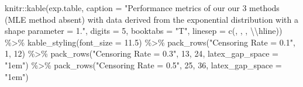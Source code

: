 \documentclass[12pt, twoside]{amherstthesis}
\newenvironment{Shaded}{\begin{snugshade}}{\end{snugshade}}
\newcommand{\AttributeTok}[1]{\textcolor[rgb]{0.77,0.63,0.00}{#1}}
\newcommand{\DecValTok}[1]{\textcolor[rgb]{0.00,0.00,0.81}{#1}}
\newcommand{\FloatTok}[1]{\textcolor[rgb]{0.00,0.00,0.81}{#1}}
\newcommand{\FunctionTok}[1]{\textcolor[rgb]{0.00,0.00,0.00}{#1}}
\newcommand{\NormalTok}[1]{#1}
\newcommand{\SpecialCharTok}[1]{\textcolor[rgb]{0.00,0.00,0.00}{#1}}
\newcommand{\StringTok}[1]{\textcolor[rgb]{0.31,0.60,0.02}{#1}}
\begin{document}
\begin{Shaded}
\begin{Highlighting}[]
\NormalTok{knitr}\SpecialCharTok{::}\FunctionTok{kable}\NormalTok{(exp.table, }\AttributeTok{caption =} \StringTok{"Performance metrics of our our 3 }
\StringTok{             methods (MLE method absent) with data derived from the }
\StringTok{             exponential distribution with a shape parameter = 1."}\NormalTok{, }
             \AttributeTok{digits =} \DecValTok{5}\NormalTok{, }\AttributeTok{booktabs =} \StringTok{"T"}\NormalTok{, }\AttributeTok{linesep =} \FunctionTok{c}\NormalTok{(}\StringTok{\textquotesingle{}\textquotesingle{}}\NormalTok{, }\StringTok{\textquotesingle{}\textquotesingle{}}\NormalTok{, }\StringTok{\textquotesingle{}\textquotesingle{}}\NormalTok{, }\StringTok{\textquotesingle{}}\SpecialCharTok{\textbackslash{}\textbackslash{}}\StringTok{hline\textquotesingle{}}\NormalTok{)) }\SpecialCharTok{\%\textgreater{}\%}
  \FunctionTok{kable\_styling}\NormalTok{(}\AttributeTok{font\_size =} \FloatTok{11.5}\NormalTok{) }\SpecialCharTok{\%\textgreater{}\%}
  \FunctionTok{pack\_rows}\NormalTok{(}\StringTok{"Censoring Rate = 0.1"}\NormalTok{, }\DecValTok{1}\NormalTok{, }\DecValTok{12}\NormalTok{) }\SpecialCharTok{\%\textgreater{}\%}
  \FunctionTok{pack\_rows}\NormalTok{(}\StringTok{"Censoring Rate = 0.3"}\NormalTok{, }\DecValTok{13}\NormalTok{, }\DecValTok{24}\NormalTok{, }\AttributeTok{latex\_gap\_space =} \StringTok{"1em"}\NormalTok{) }\SpecialCharTok{\%\textgreater{}\%}
  \FunctionTok{pack\_rows}\NormalTok{(}\StringTok{"Censoring Rate = 0.5"}\NormalTok{, }\DecValTok{25}\NormalTok{, }\DecValTok{36}\NormalTok{, }\AttributeTok{latex\_gap\_space =} \StringTok{"1em"}\NormalTok{)}
\end{Highlighting}
\end{Shaded}
\end{document}
